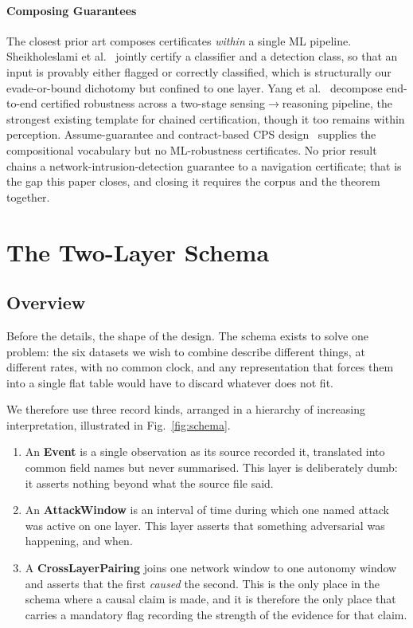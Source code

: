 \paragraph{Composing Guarantees}
The closest prior art composes certificates \emph{within} a single ML pipeline.
Sheikholeslami et al.~\cite{sheikholeslami2021provably} jointly certify a
classifier and a detection class, so that an input is provably either flagged or
correctly classified, which is structurally our evade-or-bound dichotomy but
confined to one layer. Yang et al.~\cite{yang2022sensing} decompose end-to-end certified
robustness across a two-stage sensing$\to$reasoning pipeline, the strongest
existing template for chained certification, though it too remains within
perception. Assume-guarantee and contract-based CPS design~\cite{pacti2024}
supplies the compositional vocabulary but no ML-robustness certificates. No
prior result chains a network-intrusion-detection guarantee to a navigation
certificate; that is the gap this paper closes, and closing it requires the
corpus and the theorem together.

\section{The Two-Layer Schema}
\label{sec:schema}
\subsection{Overview}
Before the details, the shape of the design. The schema exists to solve one
problem: the six datasets we wish to combine describe different things, at
different rates, with no common clock, and any representation that forces them
into a single flat table would have to discard whatever does not fit.

We therefore use three record kinds, arranged in a hierarchy of increasing
interpretation, illustrated in Fig.~\ref{fig:schema}.

\begin{enumerate}
\item An \textbf{Event} is a single observation as its source recorded it,
translated into common field names but never summarised. This layer is
deliberately dumb: it asserts nothing beyond what the source file said.
\item An \textbf{AttackWindow} is an interval of time during which one named
attack was active on one layer. This layer asserts that something adversarial
was happening, and when.
\item A \textbf{CrossLayerPairing} joins one network window to one autonomy
window and asserts that the first \emph{caused} the second. This is the only
place in the schema where a causal claim is made, and it is therefore the only
place that carries a mandatory flag recording the strength of the evidence for
that claim.
\end{enumerate}

